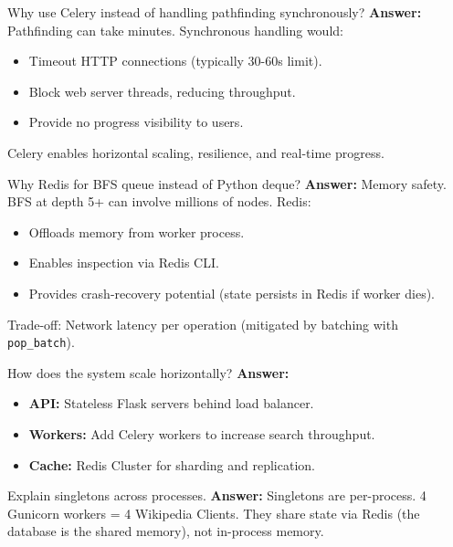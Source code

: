 \documentclass[11pt,a4paper]{article}
\begin{document}
\begin{qabox}{Why use Celery instead of handling pathfinding synchronously?}
\textbf{Answer:} Pathfinding can take minutes. Synchronous handling would:
\begin{itemize}[leftmargin=*, nosep]
    \item Timeout HTTP connections (typically 30-60s limit).
    \item Block web server threads, reducing throughput.
    \item Provide no progress visibility to users.
\end{itemize}
Celery enables horizontal scaling, resilience, and real-time progress.
\end{qabox}

\begin{qabox}{Why Redis for BFS queue instead of Python deque?}
\textbf{Answer:} Memory safety. BFS at depth 5+ can involve millions of nodes. Redis:
\begin{itemize}[leftmargin=*, nosep]
    \item Offloads memory from worker process.
    \item Enables inspection via Redis CLI.
    \item Provides crash-recovery potential (state persists in Redis if worker dies).
\end{itemize}
Trade-off: Network latency per operation (mitigated by batching with \texttt{pop\_batch}).
\end{qabox}

\begin{qabox}{How does the system scale horizontally?}
\textbf{Answer:}
\begin{itemize}[leftmargin=*, nosep]
    \item \textbf{API:} Stateless Flask servers behind load balancer.
    \item \textbf{Workers:} Add Celery workers to increase search throughput.
    \item \textbf{Cache:} Redis Cluster for sharding and replication.
\end{itemize}
\end{qabox}

\begin{qabox}{Explain singletons across processes.}
\textbf{Answer:} Singletons are per-process. 4 Gunicorn workers = 4 Wikipedia Clients. They share state via Redis (the database is the shared memory), not in-process memory.
\end{qabox}
\end{document}
